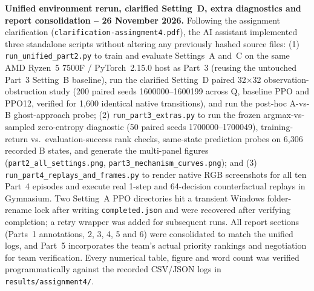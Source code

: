 \medskip
\noindent\textbf{Unified environment rerun, clarified Setting~D, extra diagnostics and report consolidation -- 26 November 2026.}
Following the assignment clarification (\texttt{clarification-assingment4.pdf}), the AI assistant
implemented three standalone scripts without altering any previously hashed source files:
(1) \texttt{run\_unified\_part2.py} to train and evaluate Settings~A and~C on the same
AMD Ryzen~5 7500F / PyTorch~2.15.0 host as Part~3 (reusing the untouched Part~3 Setting~B baseline),
run the clarified Setting~D paired 32$\times$32 observation-obstruction study (200 paired seeds
1600000--1600199 across Q, baseline PPO and PPO12, verified for 1,600 identical native transitions),
and run the post-hoc A-vs-B ghost-approach probe;
(2) \texttt{run\_part3\_extras.py} to run the frozen argmax-vs-sampled zero-entropy diagnostic
(50 paired seeds 1700000--1700049), training-return vs.\ evaluation-success rank checks,
same-state prediction probes on 6,306 recorded B states, and generate the multi-panel figures
(\texttt{part2\_all\_settings.png}, \texttt{part3\_mechanism\_curves.png}); and
(3) \texttt{run\_part4\_replays\_and\_frames.py} to render native RGB screenshots for all ten
Part~4 episodes and execute real 1-step and 64-decision counterfactual replays in Gymnasium.
Two Setting~A PPO directories hit a transient Windows folder-rename lock after writing
\texttt{completed.json} and were recovered after verifying completion; a retry wrapper was added
for subsequent runs. All report sections (Parts~1 annotations, 2, 3, 4, 5 and 6) were consolidated
to match the unified logs, and Part~5 incorporates the team's actual priority rankings and negotiation
for team verification. Every numerical table, figure and word count was verified programmatically
against the recorded CSV/JSON logs in \texttt{results/assignment4/}.
